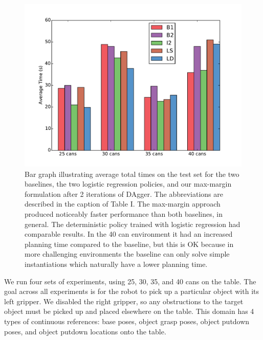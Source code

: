 \begin{figure}[h]
  \centering
    \includegraphics[scale=0.43]{images/results_bar_time}
  \caption{\small{Bar graph illustrating average total times on the test set for the
two baselines, the two logistic regression policies, and our max-margin formulation after 2 iterations of DAgger. The abbreviations are described in the caption of Table I. The max-margin approach produced noticeably faster
performance than both baselines, in general. The deterministic policy trained with logistic regression had comparable results. In the 40 can environment it had an increased planning time compared to the baseline, but this is OK because in more challenging environments the baseline can only solve simple instantiations which naturally have a lower planning time.}}
  \label{fig:results_bar_time}
\end{figure}

We run four sets of experiments, using 25, 30, 35, and 40 cans on the table.
The goal across all experiments is for the robot to pick up a particular object with its
left gripper. We disabled the right gripper, so any obstructions to the target object must be picked up and
placed elsewhere on the table. This domain has 4 types of continuous references: base poses, object grasp
poses, object putdown poses, and object putdown locations onto the table.

